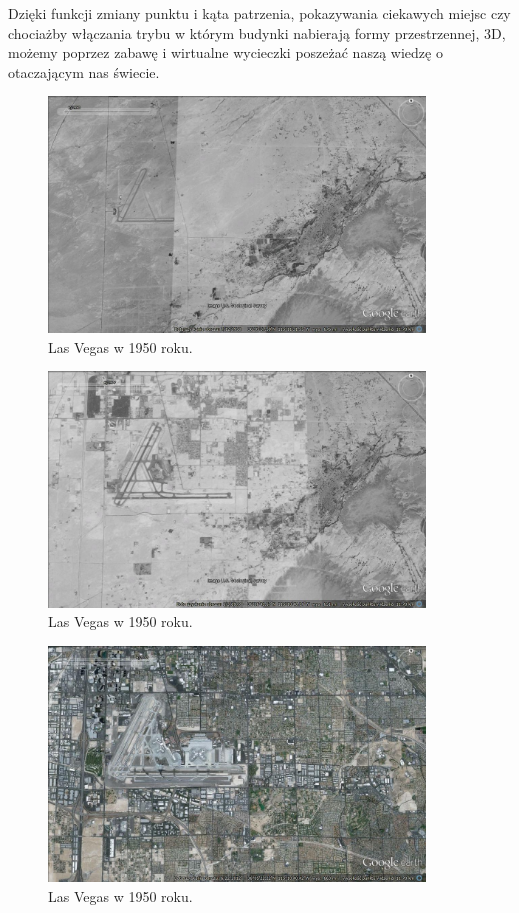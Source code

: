 Dzięki funkcji zmiany punktu i kąta patrzenia, pokazywania ciekawych miejsc czy chociażby włączania trybu w którym budynki nabierają formy przestrzennej, 3D, możemy poprzez zabawę i wirtualne wycieczki poszeżać naszą wiedzę o otaczającym nas świecie.

\begin{figure}[H]
  \centering
    \includegraphics[width=100mm]{ge/01_1950.jpg}
  \caption{Las Vegas w 1950 roku.}
  \label{fig:lasVegas1}
\end{figure}

\begin{figure}[H]
  \centering
    \includegraphics[width=100mm]{ge/02_1977.jpg}
  \caption{Las Vegas w 1950 roku.}
  \label{fig:lasVegas2}
\end{figure}

\begin{figure}[H]
  \centering
    \includegraphics[width=100mm]{ge/03_2012.jpg}
  \caption{Las Vegas w 1950 roku.}
  \label{fig:lasVegas3}
\end{figure}

